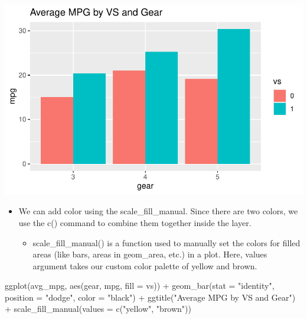\documentclass[
  letterpaper,
  DIV=11,
  numbers=noendperiod]{scrreprt}
\newenvironment{Shaded}{\begin{snugshade}}{\end{snugshade}}
\newcommand{\AttributeTok}[1]{\textcolor[rgb]{0.40,0.45,0.13}{#1}}
\newcommand{\FunctionTok}[1]{\textcolor[rgb]{0.28,0.35,0.67}{#1}}
\newcommand{\NormalTok}[1]{\textcolor[rgb]{0.00,0.23,0.31}{#1}}
\newcommand{\SpecialCharTok}[1]{\textcolor[rgb]{0.37,0.37,0.37}{#1}}
\newcommand{\StringTok}[1]{\textcolor[rgb]{0.13,0.47,0.30}{#1}}
\providecommand{\tightlist}{%
  \setlength{\itemsep}{0pt}\setlength{\parskip}{0pt}}\usepackage{longtable,booktabs,array}
\begin{document}
\includegraphics{dataviz_files/figure-pdf/unnamed-chunk-39-1.pdf}

\begin{itemize}
\tightlist
\item
  We can add color using the scale\_fill\_manual. Since there are two
  colors, we use the c() command to combine them together inside the
  layer.

  \begin{itemize}
  \tightlist
  \item
    scale\_fill\_manual() is a function used to manually set the colors
    for filled areas (like bars, areas in geom\_area, etc.) in a plot.
    Here, values argument takes our custom color palette of yellow and
    brown.
  \end{itemize}
\end{itemize}

\begin{Shaded}
\begin{Highlighting}[]
\FunctionTok{ggplot}\NormalTok{(avg\_mpg, }\FunctionTok{aes}\NormalTok{(gear, mpg, }\AttributeTok{fill =}\NormalTok{ vs)) }\SpecialCharTok{+} \FunctionTok{geom\_bar}\NormalTok{(}\AttributeTok{stat =} \StringTok{"identity"}\NormalTok{,}
    \AttributeTok{position =} \StringTok{"dodge"}\NormalTok{, }\AttributeTok{color =} \StringTok{"black"}\NormalTok{) }\SpecialCharTok{+} \FunctionTok{ggtitle}\NormalTok{(}\StringTok{"Average MPG by VS and Gear"}\NormalTok{) }\SpecialCharTok{+}
    \FunctionTok{scale\_fill\_manual}\NormalTok{(}\AttributeTok{values =} \FunctionTok{c}\NormalTok{(}\StringTok{"yellow"}\NormalTok{, }\StringTok{"brown"}\NormalTok{))}
\end{Highlighting}
\end{Shaded}
\end{document}

